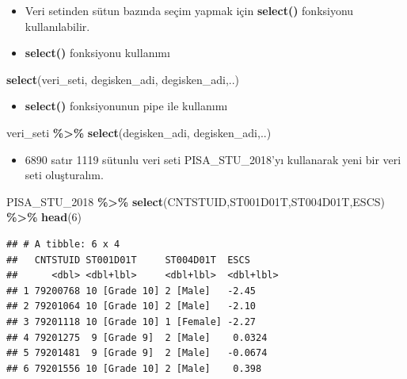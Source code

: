 \documentclass[
  oneside]{book}
\newenvironment{Shaded}{\begin{snugshade}}{\end{snugshade}}
\newcommand{\DecValTok}[1]{\textcolor[rgb]{0.00,0.00,0.81}{#1}}
\newcommand{\FunctionTok}[1]{\textcolor[rgb]{0.13,0.29,0.53}{\textbf{#1}}}
\newcommand{\NormalTok}[1]{#1}
\newcommand{\SpecialCharTok}[1]{\textcolor[rgb]{0.81,0.36,0.00}{\textbf{#1}}}
\providecommand{\tightlist}{%
  \setlength{\itemsep}{0pt}\setlength{\parskip}{0pt}}
\begin{document}
\begin{itemize}
\item
  Veri setinden sütun bazında seçim yapmak için \textbf{select()} fonksiyonu kullanılabilir.
\item
  \textbf{select()} fonksiyonu kullanımı
\end{itemize}

\begin{Shaded}
\begin{Highlighting}[]
\FunctionTok{select}\NormalTok{(veri\_seti, degisken\_adi, degisken\_adi,..)}
\end{Highlighting}
\end{Shaded}

\begin{itemize}
\tightlist
\item
  \textbf{select()} fonksiyonunun pipe ile kullanımı
\end{itemize}

\begin{Shaded}
\begin{Highlighting}[]
\NormalTok{veri\_seti }\SpecialCharTok{\%\textgreater{}\%} \FunctionTok{select}\NormalTok{(degisken\_adi, degisken\_adi,..)}
\end{Highlighting}
\end{Shaded}

\begin{itemize}
\tightlist
\item
  6890 satır 1119 sütunlu veri seti
  PISA\_STU\_2018'yı kullanarak yeni bir veri seti oluşturalım.
\end{itemize}

\begin{Shaded}
\begin{Highlighting}[]
\NormalTok{PISA\_STU\_2018 }\SpecialCharTok{\%\textgreater{}\%} \FunctionTok{select}\NormalTok{(CNTSTUID,ST001D01T,ST004D01T,ESCS) }\SpecialCharTok{\%\textgreater{}\%}
\FunctionTok{head}\NormalTok{(}\DecValTok{6}\NormalTok{)}
\end{Highlighting}
\end{Shaded}

\begin{verbatim}
## # A tibble: 6 x 4
##   CNTSTUID ST001D01T     ST004D01T  ESCS     
##      <dbl> <dbl+lbl>     <dbl+lbl>  <dbl+lbl>
## 1 79200768 10 [Grade 10] 2 [Male]   -2.45    
## 2 79201064 10 [Grade 10] 2 [Male]   -2.10    
## 3 79201118 10 [Grade 10] 1 [Female] -2.27    
## 4 79201275  9 [Grade 9]  2 [Male]    0.0324  
## 5 79201481  9 [Grade 9]  2 [Male]   -0.0674  
## 6 79201556 10 [Grade 10] 2 [Male]    0.398
\end{verbatim}
\end{document}
